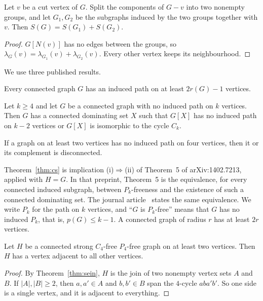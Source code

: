 \documentclass[ASNA]{USG}
\theoremstyle{WBstyletwo}
\numberwithin{equation}{section}
\newcommand{\pp}{p}
\begin{document}
\begin{lemma}\label{lem:cut}
Let $v$ be a cut vertex of $G$. Split the components of $G-v$ into two nonempty groups, and let $G_1,G_2$ be the subgraphs induced by the two groups together with $v$. Then $S(G)=S(G_1)+S(G_2)$.
\end{lemma}

\begin{proof}
$G[N(v)]$ has no edges between the groups, so $\lambda_G(v)=\lambda_{G_1}(v)+\lambda_{G_2}(v)$. Every other vertex keeps its neighbourhood.
\end{proof}

We use three published results.

\begin{theorem}\label{thm:ess}
Every connected graph $G$ has an induced path on at least $2r(G)-1$ vertices.
\end{theorem}

\begin{theorem}\label{thm:cs}
Let $k\ge 4$ and let $G$ be a connected graph with no induced path on $k$ vertices. Then $G$ has a connected dominating set $X$ such that $G[X]$ has no induced path on $k-2$ vertices or $G[X]$ is isomorphic to the cycle $C_k$.
\end{theorem}

\begin{theorem}\label{thm:sein}
If a graph on at least two vertices has no induced path on four vertices, then it or its complement is disconnected.
\end{theorem}

Theorem~\ref{thm:cs} is implication (i)$\Rightarrow$(ii) of Theorem~5 of arXiv:1402.7213, applied with $H=G$. In that preprint, Theorem~5 is the equivalence, for every connected induced subgraph, between $P_k$-freeness and the existence of such a connected dominating set. The journal article~\cite{cs} states the same equivalence. We write $P_k$ for the path on $k$ vertices, and ``$G$ is $P_k$-free'' means that $G$ has no induced $P_k$, that is, $\pp(G)\le k-1$. A connected graph of radius $r$ has at least $2r$ vertices.

\begin{lemma}\label{lem:join}
Let $H$ be a connected strong $C_4$-free $P_4$-free graph on at least two vertices. Then $H$ has a vertex adjacent to all other vertices.
\end{lemma}

\begin{proof}
By Theorem~\ref{thm:sein}, $H$ is the join of two nonempty vertex sets $A$ and $B$. If $|A|,|B|\ge 2$, then $a,a'\in A$ and $b,b'\in B$ span the $4$-cycle $aba'b'$. So one side is a single vertex, and it is adjacent to everything.
\end{proof}
\end{document}
